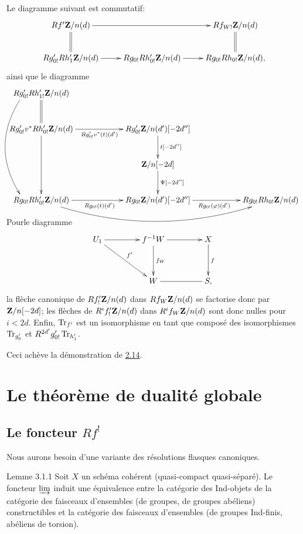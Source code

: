 \documentclass[10pt]{../fichiers-configuration-latex/smfart}
\begin{document}
Le diagramme suivant est commutatif:
$$
\xymatrix{
  Rf'\ZZ/n(d) \ar[rr]\ar@{=}[d] & & Rf_{W!}\ZZ/n(d) \ar@{=}[d]\\
Rg'_{0!} Rh'_1\ZZ/n(d) \ar[r]& Rg_{0!} Rh'_{0!}\ZZ/n(d) \ar[r]& Rg_{0!}
Rh_{0!}\ZZ/n(d), 
}
$$
ainsi que le diagramme
$$
\xymatrix@C=2.1cm@R=1cm{
  Rg'_{0!} Rh'_{1!} \ZZ/n(d)   \ar@{=}[d] \ar@<-5ex>@/_2pc/[ddd]& &\\
Rg'_{0!} v^{\ast} Rh'_{0!} \ZZ/n(d)
 \ar[dd] \ar[r]_{Rg'_{0!}v^{\ast}(t)(d')}& 
Rg'_{0!}\ZZ/n(d')[-2d''] \ar[d]^{t[-2d'']}& \\
   & \ZZ/n[-2d] \ar[d]^{\Psi[-2d'']}\\
Rg_{0!} Rh'_{0!} \ZZ/n(d) \ar[r]_{Rg_{0!}(t)(d')} \ar@/_2.2pc/[rr]& Rg_{0!}\ZZ/n(d')[-2d''] \ar[r]_{Rg_{0!}(\varphi)(d')}& Rg_{0!}Rh_{0!}\ZZ/n(d)
}
$$
Pour\pageoriginale le diagramme
$$
\xymatrix@C=1.5cm@R=1.25cm{
U_1 \ar[r]\ar[rd]^{f'} & f^{-1}W \ar[r]\ar[d]^{f_W}& X\ar[d]^{f}\\
                       &  W \ar@{-}[r]     & S,
}
$$
la flèche canonique de $Rf'_{!}\mathbf{Z}/n(d)$ dans
$Rf_{W}\mathbf{Z}/n(d)$ se factorise donc par $\mathbf{Z}/n[-2d]$; les
flèches de $R^{i}f'_{!}\mathbf{Z}/n(d)$ dans
$R^{i}f_{W}\mathbf{Z}/n(d)$ sont donc nulles pour $i<2d$. Enfin,
$\operatorname{Tr}_{f'}$ est un isomorphisme en tant que composé des isomorphismes
$\operatorname{Tr}_{g'_{0}}$ et $R^{2d'}g'_{0!}\operatorname{Tr}_{h'_{1}}$.

Ceci achève la démonstration de \hyperref[XVIII.thm2.14]{2.14}.

\section{Le théorème de dualité globale}\pageoriginale 

\subsection{Le foncteur $Rf^{!}$}

Nous aurons besoin d'une variante des résolutions flasques canoniques.

\begin{enonce*}{Lemme 3.1.1}
Soit $X$ un schéma cohérent (\ie quasi-compact quasi-séparé). Le
foncteur $\varinjlim$ induit une équivalence entre la catégorie des
Ind-objets de la catégorie des faisceaux d'ensembles (\resp de
groupes, \resp de groupes abéliens) constructibles et la catégorie des
faisceaux d'ensembles (\resp de groupes Ind-finis, \resp abéliens de torsion).
\end{enonce*}
\end{document}
